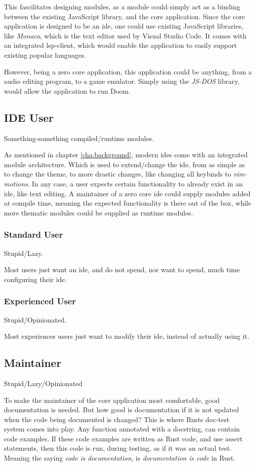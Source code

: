 This fascilitates designing modules, as a module could simply act as a binding
between the existing JavaScript library, and the core application. Since the
core application is designed to be an \gls{ide}, one could use existing
JavaScript libraries, like \textit{Monaco}, which is the text editor used by
Visual Studio Code. It comes with an integrated \gls{lsp}-client, which would
enable the application to easily support existing popular languages.

However, being a zero core application, this application could be anything, from
a audio editing program, to a game emulator. Simply using the \textit{JS-DOS}
library, would allow the application to run Doom.

\subsection{IDE User}

Something-something compiled/runtime modules.

As mentioned in chapter \ref{cha:background}, modern \gls{ide}s come with an
integrated module architecture. Which is used to extend/change the \gls{ide},
from as simple as to change the theme, to more drastic changes, like changing
all keybinds to \textit{vim-motions}. In any case, a user expects certain
functionality to already exist in an \gls{ide}, like text editing. A maintainer
of a zero core \gls{ide} could supply modules added at compile time, meaning the
expected functionality is there out of the box, while more thematic modules
could be supplied as runtime modules.

\subsubsection{Standard User}

Stupid/Lazy.

Most users just want an \gls{ide}, and do not spend, nor want to spend, much
time configuring their \gls{ide}.

\subsubsection{Experienced User}

Stupid/Opinionated.

Most experiences users just want to modify their \gls{ide}, instead of actually
using it.

\subsection{Maintainer}

Stupid/Lazy/Opinionated

To make the maintainer of the core application most comfortable, good
documentation is needed. But how good is documentation if it is not updated
when the code being documented is changed? This is where Rusts doc-test system
comes into play. Any function annotated with a docstring, can contain code
examples. If these code examples are written as Rust code, and use assert
statements, then this code is run, during testing, as if it was an actual test.
Meaning the saying \textit{code is documentation}, is
\textit{documentation is code} in Rust.
